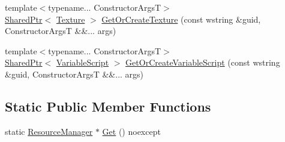 \begin{DoxyCompactItemize}
\item 
{\footnotesize template$<$typename... Constructor\+ArgsT$>$ }\\\hyperlink{namespacemage_a1e01ae66713838a7a67d30e44c67703e}{Shared\+Ptr}$<$ \hyperlink{classmage_1_1_texture}{Texture} $>$ \hyperlink{classmage_1_1_resource_manager_adc5918799339dbf9be4b49922779ddf7}{Get\+Or\+Create\+Texture} (const wstring \&guid, Constructor\+ArgsT \&\&... args)
\item 
{\footnotesize template$<$typename... Constructor\+ArgsT$>$ }\\\hyperlink{namespacemage_a1e01ae66713838a7a67d30e44c67703e}{Shared\+Ptr}$<$ \hyperlink{classmage_1_1_variable_script}{Variable\+Script} $>$ \hyperlink{classmage_1_1_resource_manager_aa3d2659c473c06423447114dcc0a602c}{Get\+Or\+Create\+Variable\+Script} (const wstring \&guid, Constructor\+ArgsT \&\&... args)
\end{DoxyCompactItemize}
\subsection*{Static Public Member Functions}
\begin{DoxyCompactItemize}
\item 
static \hyperlink{classmage_1_1_resource_manager}{Resource\+Manager} $\ast$ \hyperlink{classmage_1_1_resource_manager_a1e6ca77d892578fc4df0e62dfbc807f6}{Get} () noexcept
\end{DoxyCompactItemize}
